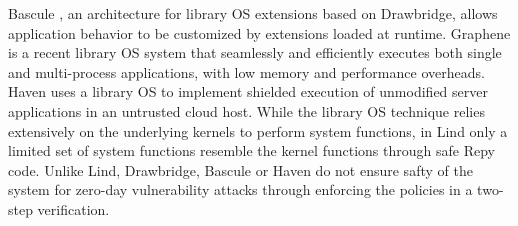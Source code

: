 
Bascule \cite{Bascule}, an architecture for library OS extensions
based on Drawbridge, allows application behavior to be customized by
extensions loaded at runtime.
Graphene \cite{Graphene-14} is a recent library OS system that
seamlessly and efficiently executes both single and
multi-process applications, with low memory and performance overheads.
Haven \cite{Haven} uses a library OS to implement
shielded execution of unmodified server applications
in an untrusted cloud host.
While the library OS technique relies extensively on
the underlying kernels to perform system functions, in Lind only
a limited set of system functions resemble the kernel functions 
through safe Repy code.  Unlike Lind, Drawbridge, Bascule 
or Haven do not ensure safty of the system for zero-day vulnerability 
attacks through enforcing the policies in a two-step verification.


